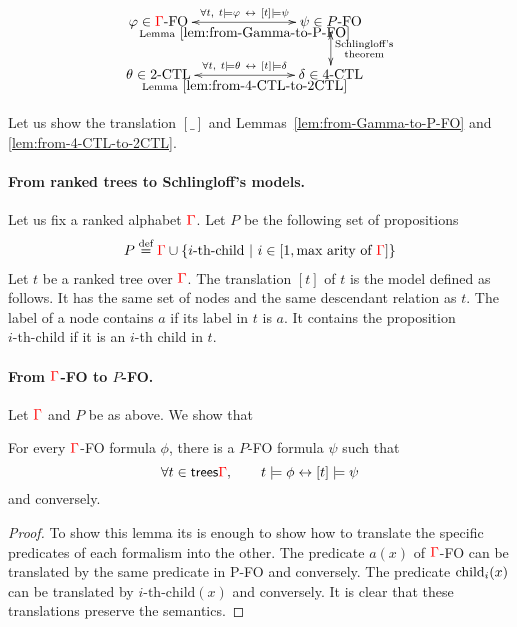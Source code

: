  
    $$\xymatrix@C=2.5cm{
        \varphi \in \rGamma\text{-FO} 
        \ar@{<->}[r]^{\forall t, \ t\models \varphi \ \leftrightarrow \ [t] \models \psi}_{\text{Lemma}~\ref{lem:from-Gamma-to-P-FO}}
        &
        \psi \in P \text{-FO}
        \ar@{<->}[d]^{\substack{\text{Schlingloff's}\\\text{theorem}}} \\
       \theta \in \text{2-CTL}
        \ar@{<->}[r]^{\forall t, \ t\models \theta \ \leftrightarrow \ [t] \models \delta}_{\text{Lemma}~\ref{lem:from-4-CTL-to-2CTL}}
        &
        \delta \in \text{4-CTL}
    }$$    

 Let us show the translation $[\_]$ and Lemmas~\ref{lem:from-Gamma-to-P-FO} and \ref{lem:from-4-CTL-to-2CTL}.

\paragraph{From ranked trees to Schlingloff's models.} Let us fix a ranked alphabet ${\color{red}{\Gamma}}$. Let $P$ be the following set of propositions
\begin{align*}
P\stackrel{\text{def}}= {\color{red}{\Gamma}}\cup\{i\text{-th-child}\ |\ i\in[1, \text{max arity of }{\color{red}{\Gamma}}]\}
\end{align*}
 Let $t$ be a ranked tree over ${\color{red}{\Gamma}}$. The translation $[t]$ of $t$ is the model defined as follows. It has the same set of nodes and the same descendant relation as $t$. The label of a node contains $a$ if its label in $t$ is $a$. It contains the proposition $i\text{-th-child}$ if it is an $i$-th child in $t$.

\paragraph{From ${\color{red}{\Gamma}}$-FO to $P$-FO.} Let ${\color{red}{\Gamma}}$ and $P$ be as above. We show that
\begin{lemma}\label{lem:from-Gamma-to-P-FO}
For every ${\color{red}{\Gamma}}$-FO formula $\phi$, there is a $P$-FO formula $\psi$ such that
$$ \forall t\in \mathsf {trees}{\color{red}{\Gamma}}, \qquad t\models \phi \leftrightarrow [t]\models \psi$$
and conversely.
\end{lemma}
\begin{proof}
To show this lemma its is enough to show how to translate the specific predicates of each formalism into the other. The predicate $a(x)$ of ${\color{red}{\Gamma}}$-FO can be translated by the same predicate in P-FO and conversely. The predicate $\mathrm{child}_{i}(x)$ can be translated by $i\text{-th-child}(x)$ and conversely.  It is clear that these translations preserve the semantics.
\end{proof}

